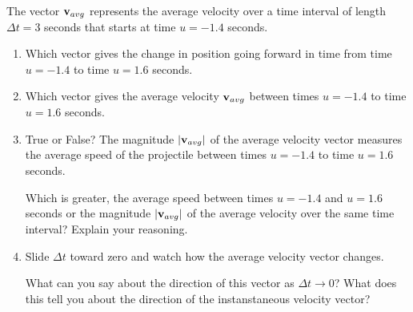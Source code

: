 \documentclass{ximera}
\begin{document}
\begin{exploration}
The vector ${\bf v}_{avg}$ represents the average velocity over a time interval of length $\Delta t=3$ seconds that starts at time  $u=-1.4$ seconds. 

\begin{question}  \label{Qfdhgyuj:Motion}

\begin{enumerate}
\item Which vector gives the change in position going forward in time from time $u=-1.4$ to time $u=1.6$ seconds. 
\begin{multipleChoice}  
\end{multipleChoice}  


\item Which vector gives the average velocity ${\bf v}_{avg}$ between times $u=-1.4$ to time $u=1.6$ seconds. 
\begin{multipleChoice}  
\end{multipleChoice}  


\item True or False? 
The magnitude $| {\bf v}_{avg} |$ of the average velocity vector measures the average speed of the projectile between times $u=-1.4$ to time $u=1.6$ seconds.
\begin{multipleChoice}  
\end{multipleChoice}  

\begin{freeResponse}
Which is greater, the average speed between times $u=-1.4$ and $u=1.6$ seconds or the magnitude $| {\bf v}_{avg} |$ of the average velocity over the same time interval? Explain your reasoning. %
\end{freeResponse}


\item Slide $\Delta t$ toward zero and watch how the average velocity vector changes. 
\begin{freeResponse}
What can you say about the direction of this vector as $\Delta t \to 0$? What does this tell you about the direction of the instanstaneous velocity vector? 
\end{freeResponse}


\end{enumerate}
\end{question}
\end{exploration}
\end{document}
